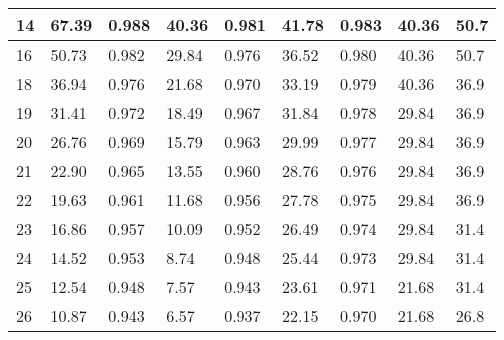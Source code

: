 \documentclass[thesis=M,czech]{FITthesis}[2016/06/26]
\begin{document}
\begin{table}[]
\begin{tabular}{|p{.3cm}|p{}|p{1cm}|p{}|p{}|p{0.95cm}|p{0.95cm}|p{1.45cm}|p{1.45cm}|}
14  & 67.39      & 0.988 & 40.36  & 0.981 & 41.78      & 0.983 & 40.36                                                                 & 50.7                                                                  \\ \hline
16  & 50.73      & 0.982 & 29.84  & 0.976 & 36.52      & 0.980 & 40.36                                                                 & 50.7                                                                  \\ \hline
18  & 36.94      & 0.976 & 21.68  & 0.970 & 33.19      & 0.979 & 40.36                                                                 & 36.9                                                                  \\ \hline
19  & 31.41      & 0.972 & 18.49  & 0.967 & 31.84      & 0.978 & 29.84                                                                 & 36.9                                                                  \\ \hline
20  & 26.76      & 0.969 & 15.79  & 0.963 & 29.99      & 0.977 & 29.84                                                                 & 36.9                                                                  \\ \hline
21  & 22.90      & 0.965 & 13.55  & 0.960 & 28.76      & 0.976 & 29.84                                                                 & 36.9                                                                  \\ \hline
22  & 19.63      & 0.961 & 11.68  & 0.956 & 27.78      & 0.975 & 29.84                                                                 & 36.9                                                                  \\ \hline
23  & 16.86      & 0.957 & 10.09  & 0.952 & 26.49      & 0.974 & 29.84                                                                 & 31.4                                                                  \\ \hline
24  & 14.52      & 0.953 & 8.74   & 0.948 & 25.44      & 0.973 & 29.84                                                                 & 31.4                                                                  \\ \hline
25  & 12.54      & 0.948 & 7.57   & 0.943 & 23.61      & 0.971 & 21.68                                                                 & 31.4                                                                  \\ \hline
26  & 10.87      & 0.943 & 6.57   & 0.937 & 22.15      & 0.970 & 21.68                                                                 & 26.8                                                                  \\ \hline

\end{tabular}
\end{table}
\end{document}
